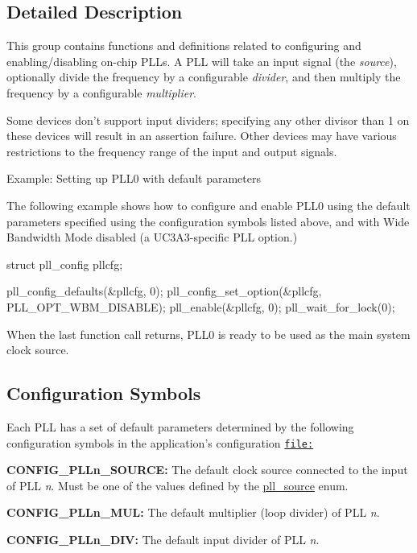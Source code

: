 \subsection{\-Detailed \-Description}
\-This group contains functions and definitions related to configuring and enabling/disabling on-\/chip \-P\-L\-Ls. \-A \-P\-L\-L will take an input signal (the {\itshape source\/}), optionally divide the frequency by a configurable {\itshape divider\/}, and then multiply the frequency by a configurable {\itshape multiplier\/}.

\-Some devices don't support input dividers; specifying any other divisor than 1 on these devices will result in an assertion failure. \-Other devices may have various restrictions to the frequency range of the input and output signals.

\begin{DoxyParagraph}{\-Example\-: \-Setting up \-P\-L\-L0 with default parameters}

\end{DoxyParagraph}
\-The following example shows how to configure and enable \-P\-L\-L0 using the default parameters specified using the configuration symbols listed above, and with \-Wide \-Bandwidth \-Mode disabled (a \-U\-C3\-A3-\/specific \-P\-L\-L option.) 
\begin{DoxyCode}
        struct pll_config pllcfg;

        pll_config_defaults(&pllcfg, 0);
        pll_config_set_option(&pllcfg, PLL_OPT_WBM_DISABLE);
        pll_enable(&pllcfg, 0);
        pll_wait_for_lock(0); 
\end{DoxyCode}


\-When the last function call returns, \-P\-L\-L0 is ready to be used as the main system clock source.\hypertarget{group__pll__group_pll_group_config}{}\subsection{\-Configuration Symbols}\label{group__pll__group_pll_group_config}
\-Each \-P\-L\-L has a set of default parameters determined by the following configuration symbols in the application's configuration \href{file:}{\tt file\-:}
\begin{DoxyItemize}
\item {\bfseries \-C\-O\-N\-F\-I\-G\-\_\-\-P\-L\-Ln\-\_\-\-S\-O\-U\-R\-C\-E\-:} \-The default clock source connected to the input of \-P\-L\-L {\itshape n\/}. \-Must be one of the values defined by the \hyperlink{group__pll__group_gacfb06d8fc0ffbe934077438884ae697f}{pll\-\_\-source} enum.
\item {\bfseries \-C\-O\-N\-F\-I\-G\-\_\-\-P\-L\-Ln\-\_\-\-M\-U\-L\-:} \-The default multiplier (loop divider) of \-P\-L\-L {\itshape n\/}.
\item {\bfseries \-C\-O\-N\-F\-I\-G\-\_\-\-P\-L\-Ln\-\_\-\-D\-I\-V\-:} \-The default input divider of \-P\-L\-L {\itshape n\/}.
\end{DoxyItemize}

